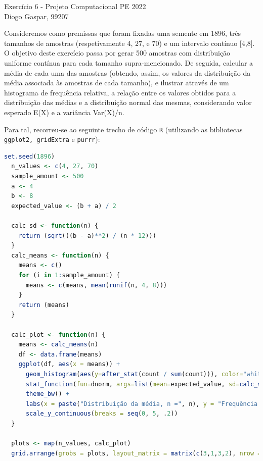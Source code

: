\documentclass[11pt]{article}
\newcommand{\gaspar}{Diogo Gaspar, 99207}
\begin{document}
\begin{center}
{\huge{Exercício 6 - Projeto Computacional PE 2022}} \\
\vspace{1.5mm}
{\large{\gaspar}} \\
\end{center}

Consideremos como premissas que foram fixadas uma semente em 1896, três
tamanhos de amostras (respetivamente 4, 27, e 70) e um intervalo contínuo [4,8].
O objetivo deste exercício passa por gerar 500 amostras com distribuição uniforme
contínua para cada tamanho supra-mencionado. De seguida, calcular a média de cada uma
das amostras (obtendo, assim, os valores da distribuição da média associada às amostras
de cada tamanho), e ilustrar através de um histograma de frequência relativa, a
relação entre os valores obtidos para a distribuição das médias e a distribuição normal
das mesmas, considerando valor esperado E(X) e a variância Var(X)/n.

\vspace{0.5mm}
Para tal, recorreu-se ao seguinte trecho de código \texttt{R} (utilizando as bibliotecas \texttt{ggplot2, gridExtra} e \texttt{purrr}):

\begin{lstlisting}[language=R]
  set.seed(1896)
  n_values <- c(4, 27, 70)
  sample_amount <- 500
  a <- 4
  b <- 8
  expected_value <- (b + a) / 2
  
  calc_sd <- function(n) {
    return (sqrt(((b - a)**2) / (n * 12)))
  }
  calc_means <- function(n) {
    means <- c()
    for (i in 1:sample_amount) {
      means <- c(means, mean(runif(n, 4, 8)))
    }
    return (means)
  }
  
  calc_plot <- function(n) {
    means <- calc_means(n)
    df <- data.frame(means)
    ggplot(df, aes(x = means)) +
      geom_histogram(aes(y=after_stat(count / sum(count))), color="white", fill="red", bins=40) +
      stat_function(fun=dnorm, args=list(mean=expected_value, sd=calc_sd(n))) +
      theme_bw() +
      labs(x = paste("Distribuição da média, n =", n), y = "Frequência Relativa") +
      scale_y_continuous(breaks = seq(0, 5, .2))
  }
  
  plots <- map(n_values, calc_plot)
  grid.arrange(grobs = plots, layout_matrix = matrix(c(3,1,3,2), nrow = 2))
\end{lstlisting}
\end{document}
